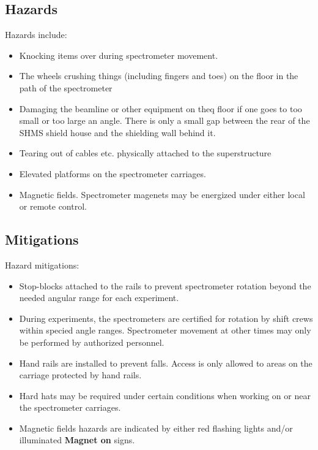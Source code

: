 \begin{safetyen}{0}{0}
\subsection{Hazards}

Hazards include:
\begin{itemize}
\item{Knocking items over during spectrometer movement.}
\item{The wheels crushing things (including fingers and toes) on the floor in the path of the
spectrometer}
\item{Damaging the beamline or other equipment on theq floor if one goes to too small
or too large an angle.  There is
only a small gap between the rear of the SHMS shield house and the shielding wall
behind it.}
\item{Tearing out of cables etc. physically attached to the superstructure}
\item{Elevated platforms on the spectrometer carriages.}
\item{Magnetic fields.  Spectrometer magenets may be energized under either
local or remote control.}
\end{itemize}

\subsection{Mitigations}
Hazard mitigations:
\begin{itemize}
	\item{Stop-blocks attached to the rails to prevent spectrometer rotation beyond
	the needed angular range for each experiment.}
	\item{During experiments, the spectrometers are certified for rotation by
	shift crews within specied angle ranges.  Spectrometer movement at other times
	may only be performed by authorized personnel.}
	\item{Hand rails are installed to prevent falls.  Access is only allowed to
	areas on the carriage protected by hand rails.}
	\item{Hard hats may be required under certain conditions when working on or
	near the spectrometer carriages.}
	\item{Magnetic fields hazards are indicated by either red flashing lights and/or
	illuminated \textbf{Magnet on} signs.}
\end{itemize}
\end{safetyen}

